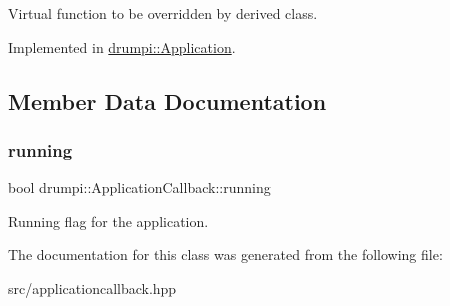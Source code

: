 Virtual function to be overridden by derived class. 

Implemented in \hyperlink{classdrumpi_1_1Application_a39fcfaf7262d03c0c6824edcd552de4f}{drumpi\+::\+Application}.



\subsection{Member Data Documentation}
\mbox{\label{classdrumpi_1_1ApplicationCallback_a2de8dc466288bf85770cf58422eecc1c}} 
\subsubsection{\texorpdfstring{running}{running}}
{\footnotesize\ttfamily bool drumpi\+::\+Application\+Callback\+::running}

Running flag for the application. 

The documentation for this class was generated from the following file\+:\begin{DoxyCompactItemize}
\item 
src/applicationcallback.\+hpp\end{DoxyCompactItemize}
